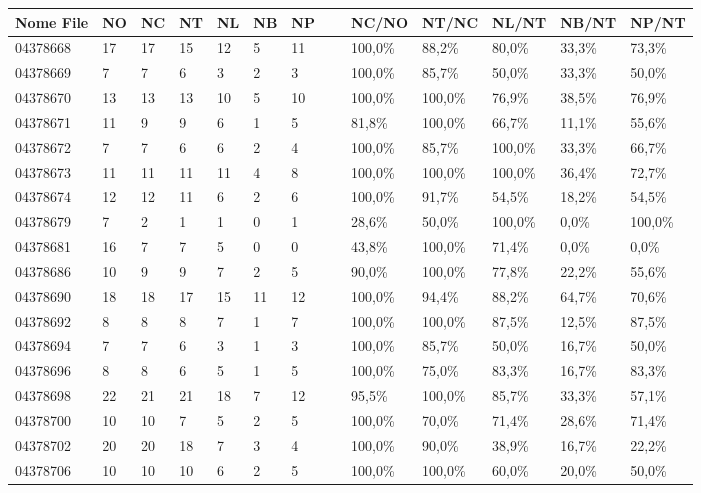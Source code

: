 	\begin{table}\label{tab:icdar}
	\begin{center}
	\begin{tabular}{|l|l|l|l|l|l|l|l|l|l|l|l|l|} \hline
Nome File & NO & NC & NT & NL & NB & NP & ~ & NC/NO & NT/NC & NL/NT & NB/NT & NP/NT \\ \hline
04378668 & 17 & 17 & 15 & 12 & 5 & 11 & ~ & 100,0\% & 88,2\% & 80,0\% & 33,3\% & 73,3\% \\
04378669 & 7 & 7 & 6 & 3 & 2 & 3 & ~ & 100,0\% & 85,7\% & 50,0\% & 33,3\% & 50,0\%\\
04378670 & 13 & 13 & 13 & 10 & 5 & 10 & ~ & 100,0\% & 100,0\% & 76,9\% & 38,5\% & 76,9\%\\
04378671 & 11 & 9 & 9 & 6 & 1 & 5 & ~ & 81,8\% & 100,0\% & 66,7\% & 11,1\% & 55,6\%\\
04378672 & 7 & 7 & 6 & 6 & 2 & 4 & ~ & 100,0\% & 85,7\% & 100,0\% & 33,3\% & 66,7\%\\
04378673 & 11 & 11 & 11 & 11 & 4 & 8 & ~ & 100,0\% & 100,0\% & 100,0\% & 36,4\% & 72,7\%\\
04378674 & 12 & 12 & 11 & 6 & 2 & 6 & ~ & 100,0\% & 91,7\% & 54,5\% & 18,2\% & 54,5\%\\
04378679 & 7 & 2 & 1 & 1 & 0 & 1 & ~ & 28,6\% & 50,0\% & 100,0\% & 0,0\% & 100,0\%\\
04378681 & 16 & 7 & 7 & 5 & 0 & 0 & ~ & 43,8\% & 100,0\% & 71,4\% & 0,0\% & 0,0\%\\
04378686 & 10 & 9 & 9 & 7 & 2 & 5 & ~ & 90,0\% & 100,0\% & 77,8\% & 22,2\% & 55,6\%\\
04378690 & 18 & 18 & 17 & 15 & 11 & 12 & ~ & 100,0\% & 94,4\% & 88,2\% & 64,7\% & 70,6\%\\
04378692 & 8 & 8 & 8 & 7 & 1 & 7 & ~ & 100,0\% & 100,0\% & 87,5\% & 12,5\% & 87,5\%\\
04378694 & 7 & 7 & 6 & 3 & 1 & 3 & ~ & 100,0\% & 85,7\% & 50,0\% & 16,7\% & 50,0\%\\
04378696 & 8 & 8 & 6 & 5 & 1 & 5 & ~ & 100,0\% & 75,0\% & 83,3\% & 16,7\% & 83,3\%\\
04378698 & 22 & 21 & 21 & 18 & 7 & 12 & ~ & 95,5\% & 100,0\% & 85,7\% & 33,3\% & 57,1\%\\
04378700 & 10 & 10 & 7 & 5 & 2 & 5 & ~ & 100,0\% & 70,0\% & 71,4\% & 28,6\% & 71,4\%\\
04378702 & 20 & 20 & 18 & 7 & 3 & 4 & ~ & 100,0\% & 90,0\% & 38,9\% & 16,7\% & 22,2\%\\
04378706 & 10 & 10 & 10 & 6 & 2 & 5 & ~ & 100,0\% & 100,0\% & 60,0\% & 20,0\% & 50,0\%\\

\end{tabular}
\end{center}
\end{table}
